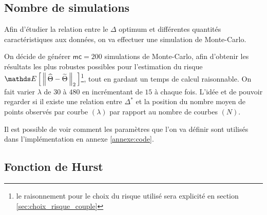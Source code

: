 
\subsection{Nombre de simulations}

Afin d'étudier la relation entre le $\Delta$ optimum et différentes quantités caractéristiques aux données, on va effectuer une simulation de Monte-Carlo.

On décide de générer $\mathsf{mc} = 200$ simulations de Monte-Carlo, afin d'obtenir les résultats les plus robustes possibles pour l'estimation du risque $\esperance{\distnorme 2 {\widehat \Theta} {\widetilde \Theta}}$\footnote{le raisonnement pour le choix du risque utilisé sera explicité en section \ref{sec:choix_risque_couple}}, tout en gardant un temps de calcul raisonnable. On fait varier $\lambda$ de $30$ à $480$ en incrémentant de $15$ à chaque fois. L'idée et de pouvoir regarder si il existe une relation entre $\Delta^*$ et la position du nombre moyen de points observés par courbe $(\lambda)$ par rapport au nombre de courbes $(N)$.

\smallskip

\noindent Il est possible de voir comment les paramètres que l'on va définir sont utilisés dans l'implémentation en annexe \ref{annexe:code}.


\newcommand{\tlnm}{T^{[\lambda]}_{n}[m]}
\newcommand{\mset}{\llbracket 1, M_n \rrbracket}
\newcommand{\nset}{\llbracket 1, N \rrbracket}
\newcommand{\lbdset}{\llbracket 30, 45, \dots , 480 \rrbracket}
\newcommand{\genxset}{\bigl(\tlnm, X_n(\tlnm)\bigr)_{m \in \mset}}
\newcommand{\simset}{\left\{ \genxset \, : \, n \in \nset, \, \lambda \& N \textsf{ fixés } \right\}}
\newcommand{\simsetall}{\left\{ \genxset \, : \, N \in \overrightarrow N, \, \lambda \in \lbdset, \, n \in \nset \right\}}

\subsection{Fonction de Hurst}
\label{sec:sim_fcn_hurst}

